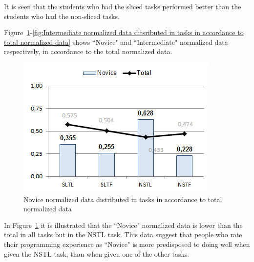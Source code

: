 \documentclass{sig-alternate-05-2015}
\begin{document}
It is seen that the students who had the sliced tasks performed better than the students who had the non-sliced tasks.

Figure~\ref{fig:Novice normalized data distributed in tasks in accordance to total normalized data}-\ref{fig:Intermediate normalized data ditsributed in tasks in accordance to total normalized data} shows ``Novice" and ``Intermediate" normalized data respectively, in accordance to the total normalized data.

\begin{figure}[!ht]
	\centering
	\includegraphics[width=1\linewidth]{img11}
	\caption{Novice normalized data distributed in tasks in accordance to total normalized data}
	\label{fig:Novice normalized data distributed in tasks in accordance to total normalized data}
\end{figure}

In Figure~\ref{fig:Novice normalized data distributed in tasks in accordance to total normalized data} it is illustrated that the ``Novice" normalized data is lower than the total in all tasks but in the NSTL task. This data suggest that people who rate their programming experience as ``Novice" is more predisposed to doing well when given the NSTL task, than when given one of the other tasks.
\end{document}
